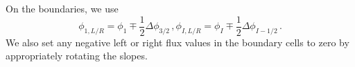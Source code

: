On the boundaries, we use 
	\begin{subequations}
		\begin{equation}
			\phi_{1,L/R} = \phi_1 \mp \frac{1}{2} \Delta \phi_{3/2} \,,
		\end{equation}
		\begin{equation}
			\phi_{I,L/R} = \phi_I \mp \frac{1}{2} \Delta \phi_{I-1/2} \,.
		\end{equation}
	\end{subequations}
We also set any negative left or right flux values in the boundary cells to zero by appropriately rotating the slopes. 
